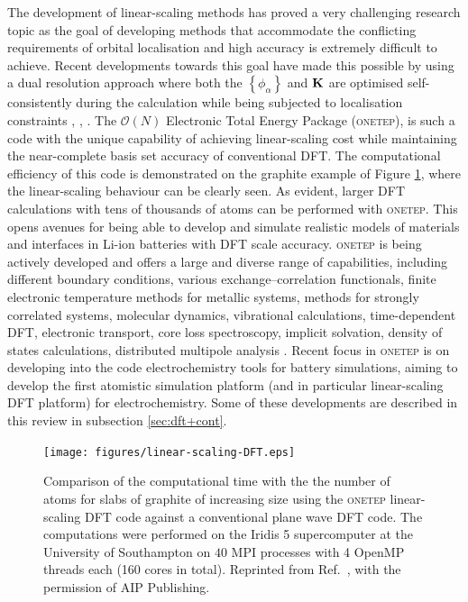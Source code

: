 \documentclass[../main.tex]{subfiles}
\begin{document}
The development of linear-scaling methods has proved a very challenging research topic as the goal of developing methods that accommodate the conflicting requirements of orbital localisation and high accuracy is extremely difficult to achieve. Recent developments towards this goal have made this possible by using a dual resolution approach where both the $\left\{\phi_\alpha\right\}$ and $\bf K$ are optimised self-consistently during the calculation while being subjected to localisation constraints \cite{ONETEP2005}, \cite{Gillan2007}, \cite{Mohr2015}. 
The $\mathcal{O}(N)$ Electronic Total Energy Package (\textsc{onetep}),\cite{ONETEP2020} is such a code with the unique capability of achieving linear-scaling cost while maintaining the near-complete basis set accuracy of conventional DFT. The computational efficiency of this code is demonstrated on the  graphite example of Figure \ref{fig:ls}, where the linear-scaling behaviour can be clearly seen. As evident, larger DFT calculations with tens of thousands of atoms can be performed with \textsc{onetep}. This opens avenues for being able to develop and simulate realistic models of  materials and interfaces in Li-ion batteries with DFT scale accuracy.  \textsc{onetep} is being actively developed and offers a  large and diverse range of capabilities, including different boundary conditions, various exchange–correlation functionals, finite electronic temperature methods for metallic systems, methods for strongly correlated systems, molecular dynamics, vibrational calculations, time-dependent DFT, electronic transport, core loss spectroscopy, implicit solvation, density of states calculations, distributed multipole analysis \cite{ONETEP2020}. Recent focus in \textsc{onetep} is on developing into the code electrochemistry tools for battery simulations, aiming to develop  the first atomistic simulation platform (and in particular linear-scaling DFT platform) for electrochemistry. Some of these developments are described in this review in subsection \ref{sec:dft+cont}.

\begin{figure}
    \centering
    \texttt{[image: figures/linear-scaling-DFT.eps]}
    \caption{Comparison of the computational time with the the number of atoms for slabs of graphite of increasing size using the \textsc{onetep} linear-scaling DFT code against a conventional plane wave DFT code. The computations were performed on the Iridis 5 supercomputer at the University of Southampton on $40$ MPI processes with 4 OpenMP threads each (160 cores in total). Reprinted from Ref.~, with the permission of AIP Publishing.}
    \label{fig:ls}
\end{figure}
\end{document}
